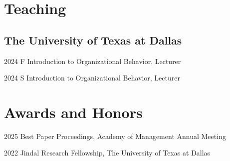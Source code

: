 \documentclass[12pt,letterpaper]{report} %
\begin{document}








    \section*{Teaching}

    \subsection*{The University of Texas at Dallas}

    \begin{tablist}

        \item[2024 F]\tab{}Introduction to Organizational Behavior, Lecturer
        \item[2024 S]\tab{}Introduction to Organizational Behavior, Lecturer
        
    \end{tablist}


    \section*{Awards and Honors} %


    \begin{tablist}

        \item[2025]\tab{}Best Paper Proceedings, Academy of Management Annual Meeting
        \item[2022]\tab{}Jindal Research Fellowship, The University of Texas at Dallas

    \end{tablist}
\end{document}
